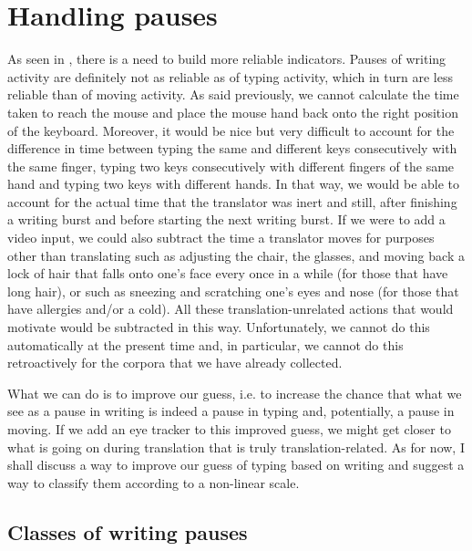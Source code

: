 \documentclass[output=paper]{LSP/langsci}
\begin{document}
\section{Handling pauses}
\label{couto:sec:HandlingPauses}

As seen in , there is a need to build more reliable  indicators. Pauses of writing activity are definitely not as reliable as  of typing activity, which in turn are less reliable than  of moving activity. As said previously, we cannot calculate the time taken to reach the mouse and place the mouse hand back onto the right position of the keyboard. Moreover, it would be nice but very difficult to account for the difference in time between typing the same and different keys consecutively with the same finger, typing two keys consecutively with different fingers of the same hand and typing two keys with different hands. In that way, we would be able to account for the actual time that the translator was inert and still, after finishing a writing burst and before starting the next writing burst. If we were to add a video input, we could also subtract the time a translator moves for purposes other than translating such as adjusting the chair, the glasses, and moving back a lock of hair that falls onto one's face every once in a while (for those that have long hair), or such as sneezing and scratching one's eyes and nose (for those that have allergies and/or a cold). All these translation-unrelated actions that would motivate  would be subtracted in this way. Unfortunately, we cannot do this automatically at the present time and, in particular, we cannot do this retroactively for the corpora that we have already collected.

What we can do is to improve our guess, i.e. to increase the chance that what we see as a pause in writing is indeed a pause in typing and, potentially, a pause in moving. If we add an eye tracker to this improved guess, we might get closer to what is going on during translation that is truly translation-related. As for now, I shall discuss a way to improve our guess of typing  based on writing  and suggest a way to classify them according to a non-linear scale.

\subsection{Classes of writing pauses}
\label{couto:sec:ClassesOfWritingPauses}
\end{document}
